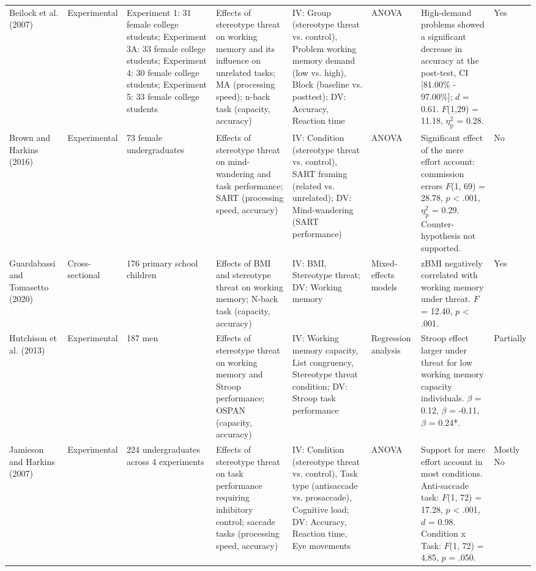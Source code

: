 \documentclass[
  stu, a4paper,floatsintext]{apa7}
\newenvironment{lltable}{\begin{landscape}\centering\begin{ThreePartTable}}{\end{ThreePartTable}\end{landscape}}
\begin{document}
\begin{lltable}
\begin{longtable}{p{1.8cm}p{2.6cm}p{2.5cm}p{3cm}p{3cm}p{3cm}p{3.5cm}p{1.5cm}}
Beilock et al. (2007) & Experimental & Experiment 1: 31 female college students; Experiment 3A: 33 female college students; Experiment 4: 30 female college students; Experiment 5: 33 female college students & Effects of stereotype threat on working memory and its influence on unrelated tasks; MA (processing speed); n-back task (capacity, accuracy) & IV: Group (stereotype threat vs. control), Problem working memory demand (low vs. high), Block (baseline vs. posttest); DV: Accuracy, Reaction time & ANOVA & High-demand problems showed a significant decrease in accuracy at the post-test, CI [81.00\% - 97.00\%]; $\textit{d}$ = 0.61. $\textit{F}$(1,29) = 11.18, $\eta^{2}_\text{p}$ = 0.28. & Yes\\
Brown and Harkins (2016) & Experimental & 73 female undergraduates & Effects of stereotype threat on mind-wandering and task performance; SART (processing speed, accuracy) & IV: Condition (stereotype threat vs. control), SART framing (related vs. unrelated); DV: Mind-wandering (SART performance) & ANOVA & Significant effect of the mere effort account: commission errors $\textit{F}$(1, 69) = 28.78, $p$ < .001, $\eta^{2}_\text{p}$ = 0.29. Counter-hypothesis not supported. & No\\
Guardabassi and Tomasetto (2020) & Cross-sectional & 176 primary school children & Effects of BMI and stereotype threat on working memory; N-back task (capacity, accuracy) & IV: BMI, Stereotype threat; DV: Working memory & Mixed-effects models & zBMI negatively correlated with working memory under threat. $F$ = 12.40, $p$ < .001. & Yes\\
Hutchison et al. (2013) & Experimental & 187 men & Effects of stereotype threat on working memory and Stroop performance; OSPAN (capacity, accuracy) & IV: Working memory capacity, List congruency, Stereotype threat condition; DV: Stroop task performance & Regression analysis & Stroop effect larger under threat for low working memory capacity individuals. $\beta$ = 0.12, $\beta$ = -0.11, $\beta$ = 0.24*. & Partially\\
Jamieson and Harkins (2007) & Experimental & 224 undergraduates across 4 experiments & Effects of stereotype threat on task performance requiring inhibitory control; saccade tasks (processing speed, accuracy) & IV: Condition (stereotype threat vs. control), Task type (antisaccade vs. prosaccade), Cognitive load; DV: Accuracy, Reaction time, Eye movements & ANOVA & Support for mere effort account in most conditions. Anti-saccade task: $F$(1, 72) = 17.28, $p$ < .001, $d$ = 0.98. Condition x Task: $F$(1, 72) = 4.85, $p$ = .050. & Mostly No\\

\end{longtable}
\end{lltable}
\end{document}
